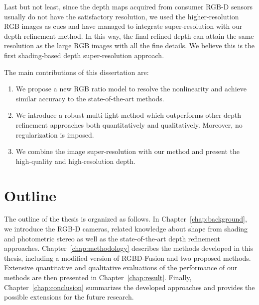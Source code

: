 Last but not least, since the depth maps acquired from consumer RGB-D sensors usually do not have the satisfactory resolution, we used the higher-resolution RGB images as cues and have managed to integrate super-resolution with our depth refinement method.
In this way, the final refined depth can attain the same resolution as the large RGB images with all the fine details.
We believe this is the first shading-based depth super-resolution approach.

The main contributions of this dissertation are:
\begin{enumerate}
    \item We propose a new RGB ratio model to resolve the nonlinearity and achieve similar accuracy to the state-of-the-art methods.
    \item We introduce a robust multi-light method which outperforms other depth refinement approaches both quantitatively and qualitatively. Moreover, no regularization is imposed.
    \item We combine the image super-resolution with our method and present the high-quality and high-resolution depth.
\end{enumerate}


\section{Outline}
The outline of the thesis is organized as follows.
In Chapter~\ref{chap:background}, we introduce the RGB-D cameras, related knowledge about shape from shading and photometric stereo as well as the state-of-the-art depth refinement approaches.
Chapter~\ref{chap:methodology} describes the methods developed in this thesis, including a modified version of RGBD-Fusion and two proposed methods. 
Extensive quantitative and qualitative evaluations of the performance of our methods are then presented in Chapter~\ref{chap:result}.
Finally, Chapter~\ref{chap:conclusion} summarizes the developed approaches and provides the possible extensions for the future research.


